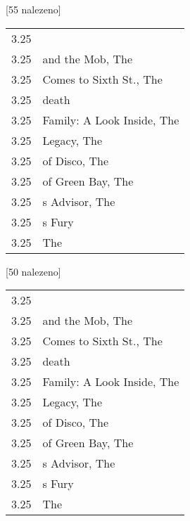 \begin{table}[ht!]
\begin{tt}

\horizlina

\noindent
\begin{minipage}[t]{.5\textwidth}\vspace{0pt}
 [55 nalezeno]\vspace{5pt}

\begin{tabulary}{1.1\textwidth}{LL}
3.25 &  \\
3.25 &  and the Mob, The \\
3.25 &  Comes to Sixth St., The \\
3.25 &  death \\
3.25 &  Family: A Look Inside, The \\
3.25 &  Legacy, The \\
3.25 &  of Disco, The \\
3.25 &  of Green Bay, The \\
3.25 & s Advisor, The \\
3.25 & s Fury \\
3.25 &  The \\
\end{tabulary}
\end{minipage}
\begin{minipage}[t]{.5\textwidth}\vspace{0pt}
 [50 nalezeno]\vspace{5pt}

\begin{tabulary}{1.1\textwidth}{LL}
3.25 &  \\
3.25 &  and the Mob, The \\
3.25 &  Comes to Sixth St., The \\
3.25 &  death \\
3.25 &  Family: A Look Inside, The \\
3.25 &  Legacy, The \\
3.25 &  of Disco, The \\
3.25 &  of Green Bay, The \\
3.25 & s Advisor, The \\
3.25 & s Fury \\
3.25 &  The \\
\end{tabulary}
\end{minipage}


\end{tt}
\end{table}
